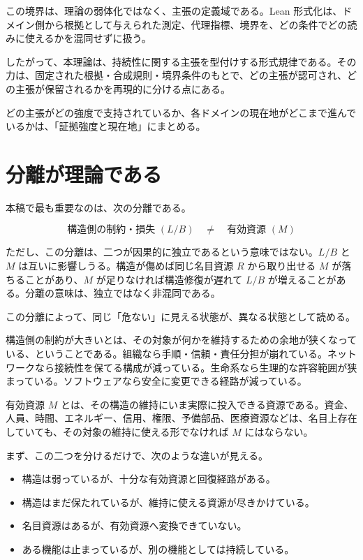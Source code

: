 \documentclass[12pt,a4paper]{article}
\begin{document}
この境界は、理論の弱体化ではなく、主張の定義域である。Lean 形式化は、ドメイン側から根拠として与えられた測定、代理指標、境界を、どの条件でどの読みに使えるかを混同せずに扱う。

したがって、本理論は、持続性に関する主張を型付けする形式規律である。その力は、固定された根拠・合成規則・境界条件のもとで、どの主張が認可され、どの主張が保留されるかを再現的に分ける点にある。

どの主張がどの強度で支持されているか、各ドメインの現在地がどこまで進んでいるかは、「証拠強度と現在地」にまとめる。

\section{分離が理論である}\label{ux5206ux96e2ux304cux7406ux8ad6ux3067ux3042ux308b}

本稿で最も重要なのは、次の分離である。

\[
\text{構造側の制約・損失 }(L/B)
\quad\neq\quad
\text{有効資源 }(M)
\]

ただし、この分離は、二つが因果的に独立であるという意味ではない。\(L/B\) と \(M\) は互いに影響しうる。構造が傷めば同じ名目資源 \(R\) から取り出せる \(M\) が落ちることがあり、\(M\) が足りなければ構造修復が遅れて \(L/B\) が増えることがある。分離の意味は、独立ではなく非混同である。

この分離によって、同じ「危ない」に見える状態が、異なる状態として読める。

構造側の制約が大きいとは、その対象が何かを維持するための余地が狭くなっている、ということである。組織なら手順・信頼・責任分担が崩れている。ネットワークなら接続性を保てる構成が減っている。生命系なら生理的な許容範囲が狭まっている。ソフトウェアなら安全に変更できる経路が減っている。

有効資源 \(M\) とは、その構造の維持にいま実際に投入できる資源である。資金、人員、時間、エネルギー、信用、権限、予備部品、医療資源などは、名目上存在していても、その対象の維持に使える形でなければ \(M\) にはならない。

まず、この二つを分けるだけで、次のような違いが見える。

\begin{itemize}
\tightlist
\item
  構造は弱っているが、十分な有効資源と回復経路がある。
\item
  構造はまだ保たれているが、維持に使える資源が尽きかけている。
\item
  名目資源はあるが、有効資源へ変換できていない。
\item
  ある機能は止まっているが、別の機能としては持続している。
\end{itemize}
\end{document}
